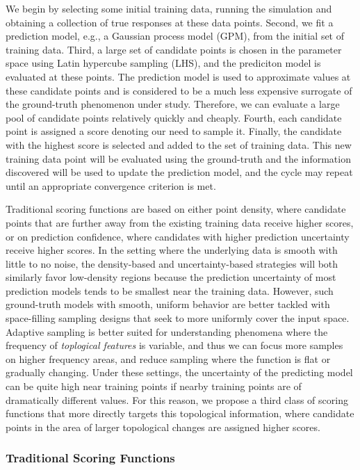 We begin by selecting some initial training data, running the simulation and obtaining a collection of true responses at these data points.
%
Second, we fit a prediction model, e.g., a Gaussian process model (GPM), from the initial set of training data.
%
Third, a large set of candidate points is chosen in the parameter space using Latin hypercube sampling (LHS), and the prediciton model is evaluated at these points.
%
The prediction model is used to approximate values at these candidate points and is considered to be a much less expensive surrogate of the ground-truth phenomenon under study.
%
Therefore, we can evaluate a large pool of candidate points relatively quickly and cheaply.
%
Fourth, each candidate point is assigned a score denoting our need to sample it.
%
Finally, the candidate with the highest score is selected and added to the set of training data.
%
This new training data point will be evaluated using the ground-truth and the information discovered will be used to update the prediction model, and the cycle may repeat until an appropriate convergence criterion is met.

Traditional scoring functions are based on either point density, where candidate points that are further away from the existing training data receive higher scores, or on prediction confidence, where candidates with higher prediction uncertainty receive higher scores.
%
In the setting where the underlying data is smooth with little to no noise, the density-based and uncertainty-based strategies will both similarly favor low-density regions because the prediction uncertainty of most prediction models tends to be smallest near the training data.
%
However, such ground-truth models with smooth, uniform behavior are better tackled with space-filling sampling designs that seek to more uniformly cover the input space.
%
Adaptive sampling is better suited for understanding phenomena where the frequency of \emph{toplogical features} is variable, and thus we can focus more samples on higher frequency areas, and reduce sampling where the function is flat or gradually changing.
%
Under these settings, the uncertainty of the predicting model can be quite high near training points if nearby training points are of dramatically different values.
%
For this reason, we propose a third class of scoring functions that more directly targets this topological
information, where candidate points in the area of larger topological changes are assigned higher scores.

\subsubsection{Traditional Scoring Functions}
\label{sec:classic}

